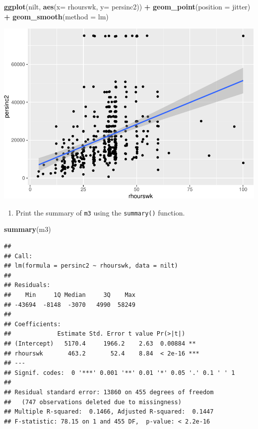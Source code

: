 \documentclass[
]{book}
\newenvironment{Shaded}{\begin{snugshade}}{\end{snugshade}}
\newcommand{\AttributeTok}[1]{\textcolor[rgb]{0.13,0.29,0.53}{#1}}
\newcommand{\FunctionTok}[1]{\textcolor[rgb]{0.13,0.29,0.53}{\textbf{#1}}}
\newcommand{\NormalTok}[1]{#1}
\newcommand{\SpecialCharTok}[1]{\textcolor[rgb]{0.81,0.36,0.00}{\textbf{#1}}}
\newcommand{\StringTok}[1]{\textcolor[rgb]{0.31,0.60,0.02}{#1}}
\providecommand{\tightlist}{%
  \setlength{\itemsep}{0pt}\setlength{\parskip}{0pt}}
\begin{document}
\begin{Shaded}
\begin{Highlighting}[]
\FunctionTok{ggplot}\NormalTok{(nilt, }\FunctionTok{aes}\NormalTok{(}\AttributeTok{x=}\NormalTok{ rhourswk, }\AttributeTok{y=}\NormalTok{ persinc2)) }\SpecialCharTok{+}
  \FunctionTok{geom\_point}\NormalTok{(}\AttributeTok{position =} \StringTok{\textquotesingle{}jitter\textquotesingle{}}\NormalTok{) }\SpecialCharTok{+}
  \FunctionTok{geom\_smooth}\NormalTok{(}\AttributeTok{method =} \StringTok{\textquotesingle{}lm\textquotesingle{}}\NormalTok{)}
\end{Highlighting}
\end{Shaded}

\begin{flushleft}\includegraphics[width=1\linewidth]{lab-workbook_files/figure-latex/unnamed-chunk-138-1} \end{flushleft}

\begin{enumerate}
\def\labelenumi{\arabic{enumi}.}
\setcounter{enumi}{1}
\tightlist
\item
  Print the summary of \texttt{m3} using the \texttt{summary()} function.
\end{enumerate}

\begin{Shaded}
\begin{Highlighting}[]
\FunctionTok{summary}\NormalTok{(m3)}
\end{Highlighting}
\end{Shaded}

\begin{verbatim}
## 
## Call:
## lm(formula = persinc2 ~ rhourswk, data = nilt)
## 
## Residuals:
##    Min     1Q Median     3Q    Max 
## -43694  -8148  -3070   4990  58249 
## 
## Coefficients:
##             Estimate Std. Error t value Pr(>|t|)    
## (Intercept)   5170.4     1966.2    2.63  0.00884 ** 
## rhourswk       463.2       52.4    8.84  < 2e-16 ***
## ---
## Signif. codes:  0 '***' 0.001 '**' 0.01 '*' 0.05 '.' 0.1 ' ' 1
## 
## Residual standard error: 13860 on 455 degrees of freedom
##   (747 observations deleted due to missingness)
## Multiple R-squared:  0.1466, Adjusted R-squared:  0.1447 
## F-statistic: 78.15 on 1 and 455 DF,  p-value: < 2.2e-16
\end{verbatim}
\end{document}
